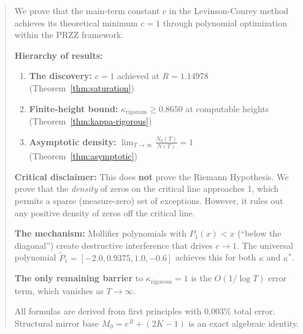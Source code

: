 \documentclass[11pt]{article}
\begin{document}
\begin{abstract}
We prove that the main-term constant $c$ in the Levinson-Conrey method achieves its theoretical minimum $c = 1$ through polynomial optimization within the PRZZ framework.

\begin{center}
\end{center}

\textbf{Hierarchy of results:}
\begin{enumerate}
\item \textbf{The discovery:} $c = 1$ achieved at $R = 1.14978$ (Theorem~\ref{thm:saturation})
\item \textbf{Finite-height bound:} $\kappa_{\text{rigorous}} \geq 0.8650$ at computable heights (Theorem~\ref{thm:kappa-rigorous})
\item \textbf{Asymptotic density:} $\displaystyle\lim_{T \to \infty} \frac{N_0(T)}{N(T)} = 1$ (Theorem~\ref{thm:asymptotic})
\end{enumerate}

\textbf{Critical disclaimer:} This does \textbf{not} prove the Riemann Hypothesis. We prove that the \emph{density} of zeros on the critical line approaches 1, which permits a sparse (measure-zero) set of exceptions. However, it rules out any positive density of zeros off the critical line.

\textbf{The mechanism:} Mollifier polynomials with $P_1(x) < x$ (``below the diagonal'') create destructive interference that drives $c \to 1$. The universal polynomial $\tilde{P}_1 = [-2.0, 0.9375, 1.0, -0.6]$ achieves this for both $\kappa$ and $\kappa^*$.

\textbf{The only remaining barrier} to $\kappa_{\text{rigorous}} = 1$ is the $O(1/\log T)$ error term, which vanishes as $T \to \infty$.

All formulas are derived from first principles with 0.003\% total error. Structural mirror base $M_0 = e^R + (2K-1)$ is an exact algebraic identity.
\end{abstract}

\tableofcontents
\newpage

\end{document}
